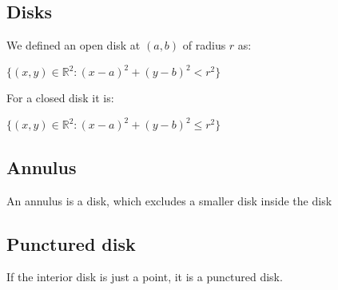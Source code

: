 

\subsection{Disks}

We defined an open disk at \((a,b)\) of radius \(r\) as:

\(\{(x,y)\in \mathbb R^2:(x-a)^2+(y-b)^2 < r^2\}\)

For a closed disk it is:

\(\{(x,y)\in \mathbb R^2:(x-a)^2+(y-b)^2 \le r^2\}\)

\subsection{Annulus}

An annulus is a disk, which excludes a smaller disk inside the disk

\subsection{Punctured disk}

If the interior disk is just a point, it is a punctured disk.

